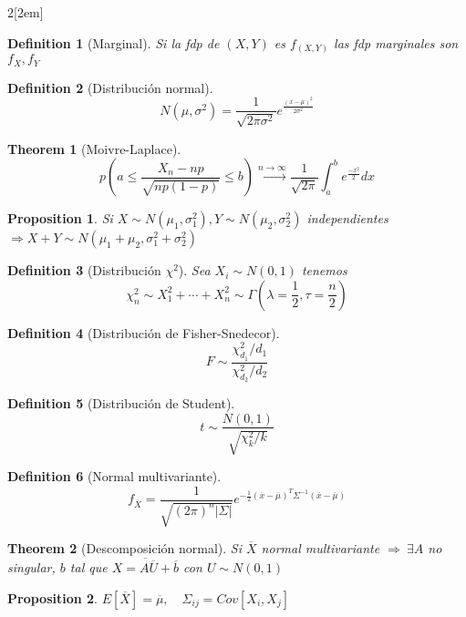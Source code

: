 \documentclass[leqno]{article}
\newtheorem*{theorem}{Theorem}
\newtheorem*{proposition}{Proposition}
\newtheorem*{definition}{Definition}
\begin{document}
\begin{multicols}{2}[\columnsep2em]
\begin{definition}[Marginal]
Si la fdp de $(X, Y)$ es  $f_{(X, Y)}$ las fdp marginales son $f_X, f_Y$
\end{definition}

\begin{definition}[Distribución normal]
\[
N(\mu, \sigma^2) = \frac{1}{\sqrt{2\pi \sigma ^2} } e^{\frac{(x-\mu)^2}{2\sigma ^2}}
\] 
\end{definition}

\begin{theorem}[Moivre-Laplace]
\[
p\left( a\le \frac{X_n-np}{\sqrt{np(1-p)} } \le b \right) \xrightarrow{n\to \infty } \frac{1}{\sqrt{2\pi} }\int_a^b e^{\frac{-x^2}{2}}dx
\] 
\end{theorem}

\begin{proposition} Si $X \sim N(\mu_1, \sigma_1^2), Y \sim N(\mu_2, \sigma_2^2)$ independientes $\Rightarrow X+Y \sim N(\mu_1+\mu_2, \sigma_1^2+\sigma_2^2)$
\end{proposition}

\begin{definition}[Distribución $\chi^2$] Sea $X_i \sim  N(0, 1)$ tenemos
\[
\chi^2_n \sim  X_1^2 + \cdots + X_n^2 \sim \Gamma \left(\lambda=\frac{1}{2}, \tau = \frac{n}{2}\right)
\] 
\end{definition}

\begin{definition}[Distribución de Fisher-Snedecor]
  \[
 F \sim \frac{\chi_{d_1}^2 / d_1}{\chi_{d_2}^2 / d_2}
  \] 
\end{definition}

\begin{definition}[Distribución de Student]
\[
t \sim \frac{N(0,1)}{\sqrt{\chi_k^2 / k }}
\] 
\end{definition}

\begin{definition}[Normal multivariante]
\[
f_{\overline{X}} = \frac{1}{\sqrt{(2\pi)^n |\Sigma|} } e^{-\frac{1}{2}(\overline{x}-\overline{\mu})^T\Sigma^{-1} (\overline{x}-\overline{\mu})}
\] 
\end{definition}

\begin{theorem}[Descomposición normal]
Si $\overline{X}$ normal multivariante $\Rightarrow \ \exists A$ no singular, $b$ tal que $\overline{X = A\overline{U}+\overline{b}}$ con $U\sim N(0,1)$
\end{theorem}

\begin{proposition}
$E[\overline{X}] = \overline{\mu}, \quad \Sigma_{ij}=Cov[X_i, X_j]$ 
\end{proposition}


\end{multicols}
\end{document}
